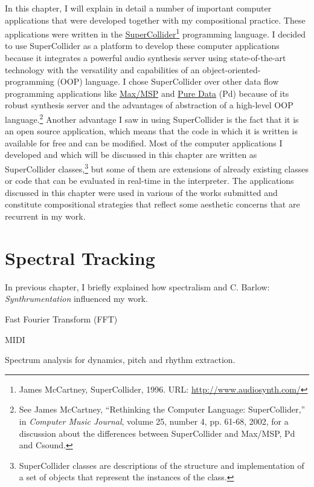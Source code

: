 In this chapter, I will explain in detail a number of important computer applications that were developed together with my compositional practice. These applications were written in the \href{http://supercollider.sourceforge.net/}{\mbox{SuperCollider}}\footnote{James McCartney, SuperCollider, 1996. URL: \href{http://www.audiosynth.com/}{http://www.audiosynth.com/}} programming language. I decided to use SuperCollider as a platform to develop these computer applications because it integrates a powerful audio synthesis server using state-of-the-art technology with the versatility and capabilities of an object-oriented-programming (OOP) language. I chose SuperCollider over other data flow programming applications like \href{http://www.cycling74.com/}{Max/MSP} and \href{http://puredata.info/}{Pure Data} (Pd) because of its robust synthesis server and the advantages of abstraction of a high-level OOP language.\footnote{See James McCartney, ``Rethinking the Computer Language: SuperCollider,'' in \emph{Computer Music Journal}, volume 25, number 4, pp. 61-68, 2002, for a discussion about the differences between SuperCollider and Max/MSP, Pd and Csound.} Another advantage I saw in using SuperCollider is the fact that it is an open source application, which means that the code in which it is written is available for free and can be modified. Most of the computer applications I developed and which will be discussed in this chapter are written as SuperCollider classes,\footnote{SuperCollider classes are descriptions of the structure and implementation of a set of objects that represent the instances of the class.} but some of them are extensions of already existing classes or code that can be evaluated in real-time in the interpreter. The applications discussed in this chapter were used in various of the works submitted and constitute compositional strategies that reflect some aesthetic concerns that are recurrent in my work.

\section{Spectral Tracking}

In previous chapter, I briefly explained how spectralism and C. Barlow: \emph{Synthrumentation} influenced my work.

Fast Fourier Transform (FFT)


MIDI

Spectrum analysis for dynamics, pitch and rhythm extraction. 

\hypertarget{partrack}{}
